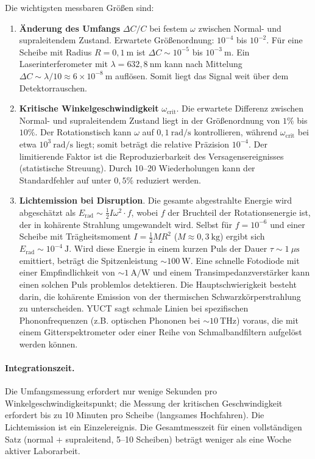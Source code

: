 \documentclass[12pt,a4paper]{article}
\begin{document}
	Die wichtigsten messbaren Größen sind:
	\begin{enumerate}
		\item \textbf{Änderung des Umfangs} \(\Delta C/C\) bei festem \(\omega\) zwischen Normal- und supraleitendem Zustand. Erwartete Größenordnung: \(10^{-4}\) bis \(10^{-2}\). Für eine Scheibe mit Radius \(R = 0,1\ \text{m}\) ist \(\Delta C \sim 10^{-5}\) bis \(10^{-3}\ \text{m}\). Ein Laserinterferometer mit \(\lambda = 632,8\ \text{nm}\) kann nach Mittelung \(\Delta C \sim \lambda/10 \approx 6\times10^{-8}\ \text{m}\) auflösen. Somit liegt das Signal weit über dem Detektorrauschen.
		
		\item \textbf{Kritische Winkelgeschwindigkeit} \(\omega_{\text{crit}}\). Die erwartete Differenz zwischen Normal- und supraleitendem Zustand liegt in der Größenordnung von \(1\%\) bis \(10\%\). Der Rotationstisch kann \(\omega\) auf \(0,1\ \text{rad/s}\) kontrollieren, während \(\omega_{\text{crit}}\) bei etwa \(10^3\ \text{rad/s}\) liegt; somit beträgt die relative Präzision \(10^{-4}\). Der limitierende Faktor ist die Reproduzierbarkeit des Versagensereignisses (statistische Streuung). Durch 10–20 Wiederholungen kann der Standardfehler auf unter \(0,5\%\) reduziert werden.
		
		\item \textbf{Lichtemission bei Disruption}. Die gesamte abgestrahlte Energie wird abgeschätzt als \(E_{\text{rad}} \sim \frac{1}{2} I \omega^2 \cdot f\), wobei \(f\) der Bruchteil der Rotationsenergie ist, der in kohärente Strahlung umgewandelt wird. Selbst für \(f = 10^{-6}\) und einer Scheibe mit Trägheitsmoment \(I = \frac{1}{2} M R^2\) (\(M \approx 0,3\ \text{kg}\)) ergibt sich \(E_{\text{rad}} \sim 10^{-4}\ \text{J}\). Wird diese Energie in einem kurzen Puls der Dauer \(\tau \sim 1\ \mu\text{s}\) emittiert, beträgt die Spitzenleistung \(\sim 100\ \text{W}\). Eine schnelle Fotodiode mit einer Empfindlichkeit von \(\sim 1\ \text{A/W}\) und einem Transimpedanzverstärker kann einen solchen Puls problemlos detektieren. Die Hauptschwierigkeit besteht darin, die kohärente Emission von der thermischen Schwarzkörperstrahlung zu unterscheiden. YUCT sagt schmale Linien bei spezifischen Phononfrequenzen (z.B. optischen Phononen bei \(\sim 10\ \text{THz}\)) voraus, die mit einem Gitterspektrometer oder einer Reihe von Schmalbandfiltern aufgelöst werden können.
	\end{enumerate}
	
	\paragraph{Integrationszeit.}
	Die Umfangsmessung erfordert nur wenige Sekunden pro Winkelgeschwindigkeitspunkt; die Messung der kritischen Geschwindigkeit erfordert bis zu 10 Minuten pro Scheibe (langsames Hochfahren). Die Lichtemission ist ein Einzelereignis. Die Gesamtmesszeit für einen vollständigen Satz (normal + supraleitend, 5–10 Scheiben) beträgt weniger als eine Woche aktiver Laborarbeit.
	
\end{document}
